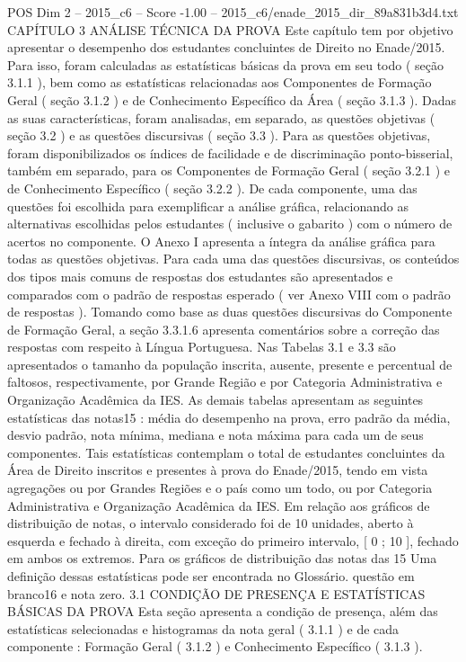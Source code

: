 \begin{textsample}{POS Dim 2 – 2015\_c6 – Score -1.00 – 2015\_c6/enade\_2015\_dir\_89a831b3d4.txt}  \label{ex:f2_pos_238}
CAPÍTULO 3 ANÁLISE TÉCNICA DA PROVA Este capítulo tem por objetivo apresentar o desempenho dos estudantes concluintes de Direito no Enade/2015.
Para isso, foram calculadas as estatísticas básicas da prova em seu todo ( seção 3.1.1 ), bem como as estatísticas relacionadas aos Componentes de Formação Geral ( seção 3.1.2 ) e de Conhecimento Específico da Área ( seção 3.1.3 ).
Dadas as suas características, foram analisadas, em separado, as questões objetivas ( seção 3.2 ) e as questões discursivas ( seção 3.3 ).
Para as questões objetivas, foram disponibilizados os índices de facilidade e de discriminação ponto-bisserial, também em separado, para os Componentes de Formação Geral ( seção 3.2.1 ) e de Conhecimento Específico ( seção 3.2.2 ).
De cada componente, uma das questões foi escolhida para exemplificar a análise gráfica, relacionando as alternativas escolhidas pelos estudantes ( inclusive o gabarito ) com o número de acertos no componente.
O Anexo I apresenta a íntegra da análise gráfica para todas as questões objetivas.
Para cada uma das questões discursivas, os conteúdos dos tipos mais comuns de respostas dos estudantes são apresentados e comparados com o padrão de respostas esperado ( ver Anexo VIII com o padrão de respostas ).
Tomando como base as duas questões discursivas do Componente de Formação Geral, a seção 3.3.1.6 apresenta comentários sobre a correção das respostas com respeito à Língua Portuguesa.
Nas Tabelas 3.1 e 3.3 são apresentados o tamanho da população inscrita, ausente, presente e percentual de faltosos, respectivamente, por Grande Região e por Categoria Administrativa e Organização Acadêmica da IES.
As demais tabelas apresentam as seguintes estatísticas das notas15 : média do desempenho na prova, erro padrão da média, desvio padrão, nota mínima, mediana e nota máxima para cada um de seus componentes.
Tais estatísticas contemplam o total de estudantes concluintes da Área de Direito inscritos e presentes à prova do Enade/2015, tendo em vista agregações ou por Grandes Regiões e o país como um todo, ou por Categoria Administrativa e Organização Acadêmica da IES.
Em relação aos gráficos de distribuição de notas, o intervalo considerado foi de 10 unidades, aberto à esquerda e fechado à direita, com exceção do primeiro intervalo, [ 0 ; 10 ], fechado em ambos os extremos.
Para os gráficos de distribuição das notas das 15 Uma definição dessas estatísticas pode ser encontrada no Glossário. questão em branco16 e nota zero. 3.1 CONDIÇÃO DE PRESENÇA E ESTATÍSTICAS BÁSICAS DA PROVA Esta seção apresenta a condição de presença, além das estatísticas selecionadas e histogramas da nota geral ( 3.1.1 ) e de cada componente : Formação Geral ( 3.1.2 ) e Conhecimento Específico ( 3.1.3 ).

\end{textsample}
